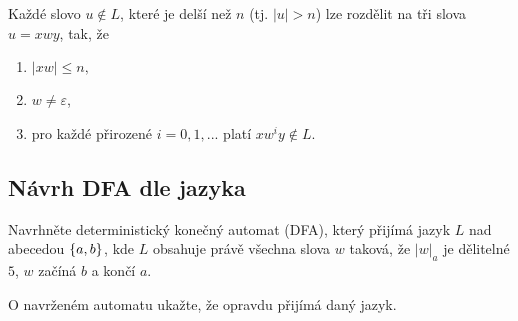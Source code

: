 Každé slovo $u \not\in L$, které je delší než $n$ (tj. $|u| > n$) lze rozdělit na tři slova $u =xwy$, tak, že
\begin{enumerate}[noitemsep]
    \item $|xw| \leq n,$
    \item $w \not= \varepsilon$,
    \item pro každé přirozené $i = 0, 1, ...$ platí $xw^iy \not\in L$.
\end{enumerate}

\subsection{Návrh DFA dle jazyka}
Navrhněte deterministický konečný automat (DFA), který přijímá jazyk $L$ nad abecedou $\left\lbrace a,b \right\rbrace$, kde $L$ obsahuje právě
všechna slova $w$ taková, že $|w|_a$ je dělitelné $5$, $w$ začíná $b$ a končí $a$.

\noindent
O navrženém automatu ukažte, že opravdu přijímá daný jazyk.

